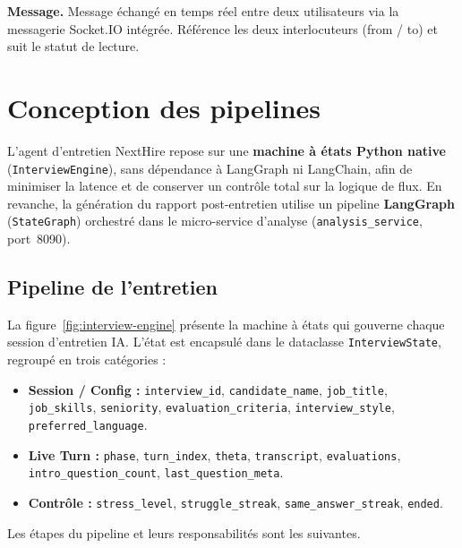 \noindent\textbf{Message.} Message échangé en temps réel entre deux utilisateurs via la
messagerie Socket.IO intégrée. Référence les deux interlocuteurs (from / to) et suit le
statut de lecture.

\section{Conception des pipelines}

\begin{sloppypar}
L'agent d'entretien NextHire repose sur une \textbf{machine à états Python native}
(\texttt{InterviewEngine}), sans dépendance à LangGraph ni LangChain, afin de
minimiser la latence et de conserver un contrôle total sur la logique de flux.
En revanche, la génération du rapport post-entretien utilise un pipeline
\textbf{LangGraph} (\texttt{StateGraph}) orchestré dans le micro-service d'analyse
(\texttt{analysis\_service}, port~8090).
\end{sloppypar}

\subsection{Pipeline de l'entretien}

\begin{sloppypar}
La figure~\ref{fig:interview-engine} présente la machine à états qui gouverne chaque
session d'entretien IA. L'état est encapsulé dans le dataclasse
\texttt{InterviewState}, regroupé en trois catégories :
\end{sloppypar}

\begin{itemize}
  \item \textbf{Session / Config :} \texttt{interview\_id}, \texttt{candidate\_name},
        \texttt{job\_title}, \texttt{job\_skills}, \texttt{seniority},
        \texttt{evaluation\_criteria}, \texttt{interview\_style},
        \texttt{preferred\_language}.
  \item \textbf{Live Turn :} \texttt{phase}, \texttt{turn\_index}, \texttt{theta},
        \texttt{transcript}, \texttt{evaluations}, \texttt{intro\_question\_count},
        \texttt{last\_question\_meta}.
  \item \textbf{Contrôle :} \texttt{stress\_level}, \texttt{struggle\_streak},
        \texttt{same\_answer\_streak}, \texttt{ended}.
\end{itemize}

\noindent Les étapes du pipeline et leurs responsabilités sont les suivantes.

